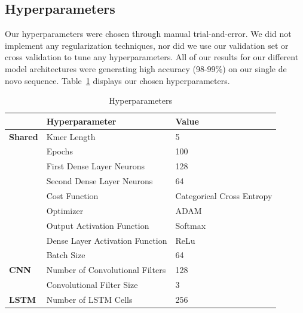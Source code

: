 \documentclass[journal]{IEEEtran}
\begin{document}
  \subsection{Hyperparameters}

    Our hyperparameters were chosen through manual trial-and-error. We did not implement
    any regularization techniques, nor did we use our validation set or cross validation to tune 
    any hyperparameters. All of our results for our different model architectures were generating
    high accuracy (98-99\%) on our single de novo sequence. Table~\ref{tab:hyperparameters}
    displays our chosen hyperparameters.

    \begin{table}[h!]
      \begin{center}
        \caption{Hyperparameters}
        \label{tab:hyperparameters}
        \begin{tabular}{l|l|l} %
          & \textbf{Hyperparameter} & \textbf{Value} \\
          \hline
          \textbf{Shared} & Kmer Length                      & 5 \\
                          & Epochs                           & 100 \\
                          & First Dense Layer Neurons        & 128 \\
                          & Second Dense Layer Neurons       & 64 \\
                          & Cost Function                    & Categorical Cross Entropy \\
                          & Optimizer                        & ADAM \\
                          & Output Activation Function       & Softmax \\
                          & Dense Layer Activation Function  & ReLu \\
                          & Batch Size                       & 64 \\
          \hline
          \textbf{CNN}    & Number of Convolutional Filters  & 128 \\
                          & Convolutional Filter Size        & 3 \\
          \hline
          \textbf{LSTM}   & Number of LSTM Cells             & 256 \\
        \end{tabular}
      \end{center}
    \end{table}
\end{document}
